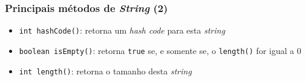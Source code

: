 \documentclass[xcolor={dvipsnames,table},aspectratio=169]{beamer}
\begin{document}
\begin{frame}\frametitle{Principais métodos de \emph{String} (2)}
\begin{itemize}
\item \texttt{int hashCode()}: retorna um \emph{hash code} para esta \emph{string}
\item \texttt{boolean isEmpty()}: retorna \texttt{true} se, e somente se, o \texttt{length()} for igual a 0
\item \texttt{int length()}: retorna o tamanho desta \emph{string}

\end{itemize}
\end{frame}
\end{document}
